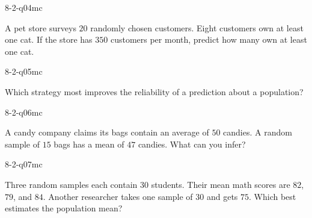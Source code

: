 \begin{practiceQuestion}{8-2-q04}{mc}
\begin{questionText}
A pet store surveys $20$ randomly chosen customers. Eight customers own at least one cat. If the store has $350$ customers per month, predict how many own at least one cat.
\end{questionText}
\end{practiceQuestion}

\begin{practiceQuestion}{8-2-q05}{mc}
\begin{questionText}
Which strategy most improves the reliability of a prediction about a population?
\end{questionText}
\end{practiceQuestion}

\begin{practiceQuestion}{8-2-q06}{mc}
\begin{questionText}
A candy company claims its bags contain an average of $50$ candies. A random sample of $15$ bags has a mean of $47$ candies. What can you infer?
\end{questionText}
\end{practiceQuestion}

\begin{practiceQuestion}{8-2-q07}{mc}
\begin{questionText}
Three random samples each contain $30$ students. Their mean math scores are $82$, $79$, and $84$. Another researcher takes one sample of $30$ and gets $75$. Which best estimates the population mean?
\end{questionText}
\end{practiceQuestion}

